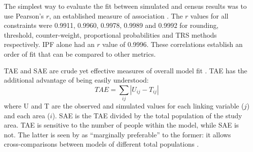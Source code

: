 \documentclass[a4paper, 11pt, twoside]{Thesis}
\begin{document}
The simplest way to evaluate the fit between simulated and census results
was to use Pearson's $r$, an established measure of association
\citep{Rodgers1988}.
The $r$ values for all constraints were 0.9911, 0.9960, 0.9978,
0.9989 and 0.9992 for rounding, threshold, counter-weight, proportional
probabilities and TRS
methods respectively. IPF alone had an $r$ value of 0.9996. These correlations
establish an order of fit that can be compared to other metrics.

TAE and SAE are crude yet effective measures of overall
model fit \citep{Voas2001}. TAE has the additional advantage of
being easily understood:
\begin{equation}
 TAE = \sum\limits_{ij}|U_{ij} - T_{ij}|
 \label{etae}
\end{equation}
where U and T are the observed and simulated values for each linking variable
($j$) and each area ($i$).
SAE is the TAE divided by the total
population of the study area. TAE is sensitive to the number of people
within the model, while SAE is not. The latter is seen by \citet{Voas2001} as
``marginally preferable'' to the former: it allows cross-comparisons between
models of different total populations \citep{Kongmuang2006-thesis}.
\end{document}
